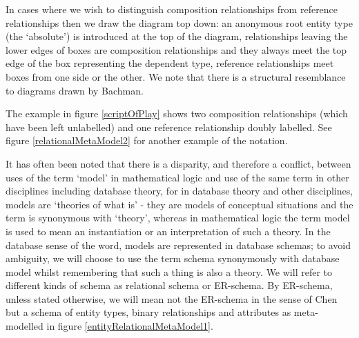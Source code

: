 \documentclass[10pt,a4paper]{article}
\begin{document}
\noindent In cases where we wish to distinguish composition relationships from reference relationships then we draw the diagram top down: an anonymous root entity type (the `absolute') is introduced at the top of
 the diagram, relationships leaving the lower edges of boxes are composition relationships and they always meet the top edge of the box representing the dependent type, reference relationships meet boxes from one side or the other. We note that there is a structural resemblance to diagrams drawn by Bachman\cite{Bachman1973}. 


The example in figure \ref{scriptOfPlay} shows two composition relationships (which have been left unlabelled) and one reference relationship doubly labelled. See figure \ref{relationalMetaModel2} for another example of the notation. \\


\noindent It has often been noted that there is a disparity, and therefore a conflict,
between uses of the term `model' in mathematical logic and use of the same term in other disciplines including database theory, for in database theory and other disciplines,  models are `theories of what is' - they are models of conceptual situations and the term is synonymous with `theory', whereas in 
mathematical logic the term model is used
to mean  an instantiation or an interpretation of such a theory. In the database sense of the word,  models are represented in database schemas; to avoid
ambiguity, we will choose to use the term schema synonymously with database model whilst remembering that such a thing is also a theory. We will refer to different kinds of 
schema as relational schema or ER-schema. 
By ER-schema, unless stated otherwise, we will mean not the ER-schema in the 
sense of Chen but a schema of entity types, 
binary relationships and attributes as meta-modelled in figure \ref{entityRelationalMetaModel1}.\\

\end{document}
